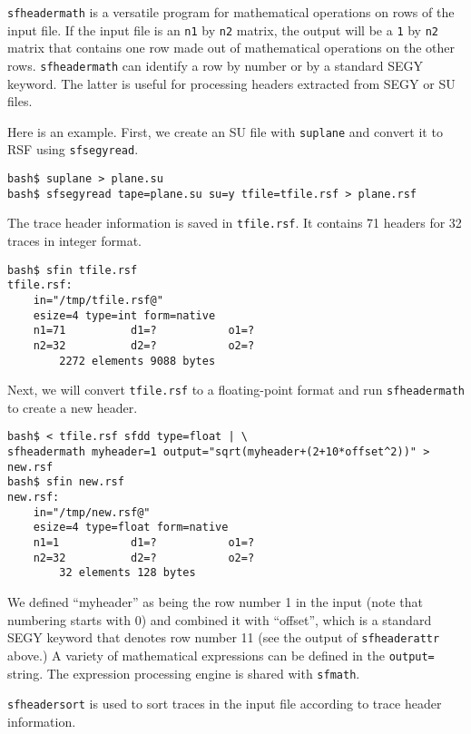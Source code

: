 \texttt{sfheadermath} is a versatile program for mathematical
operations on rows of the input file. If the input file is an
\texttt{n1} by \texttt{n2} matrix, the output will be a \texttt{1} by
\texttt{n2} matrix that contains one row made out of mathematical
operations on the other rows. \texttt{sfheadermath} can identify a row
by number or by a standard SEGY keyword. The latter is useful for
processing headers extracted from SEGY or SU files.

Here is an example. First, we create an SU file with \texttt{suplane} and convert it to RSF using \texttt{sfsegyread}.
\begin{verbatim}
bash$ suplane > plane.su
bash$ sfsegyread tape=plane.su su=y tfile=tfile.rsf > plane.rsf
\end{verbatim}
The trace header information is saved in \texttt{tfile.rsf}. It
contains 71 headers for 32 traces in integer format.
\begin{verbatim}
bash$ sfin tfile.rsf
tfile.rsf:
    in="/tmp/tfile.rsf@"
    esize=4 type=int form=native
    n1=71          d1=?           o1=?
    n2=32          d2=?           o2=?
        2272 elements 9088 bytes
\end{verbatim}
Next, we will convert \texttt{tfile.rsf} to a floating-point format
and run \texttt{sfheadermath} to create a new header.
\begin{verbatim}
bash$ < tfile.rsf sfdd type=float | \
sfheadermath myheader=1 output="sqrt(myheader+(2+10*offset^2))" > new.rsf
bash$ sfin new.rsf
new.rsf:
    in="/tmp/new.rsf@"
    esize=4 type=float form=native
    n1=1           d1=?           o1=?
    n2=32          d2=?           o2=?
        32 elements 128 bytes
\end{verbatim}
We defined ``myheader'' as being the row number 1 in the input (note
that numbering starts with 0) and combined it with ``offset'', which
is a standard SEGY keyword that denotes row number 11 (see the output
of \texttt{sfheaderattr} above.) A variety of mathematical expressions
can be defined in the \texttt{output=} string. The expression
processing engine is shared with \texttt{sfmath}.

\noindent\doublebox{\parbox{\textwidth}{

}}

\texttt{sfheadersort} is used to sort traces in the input file
according to trace header information. 

